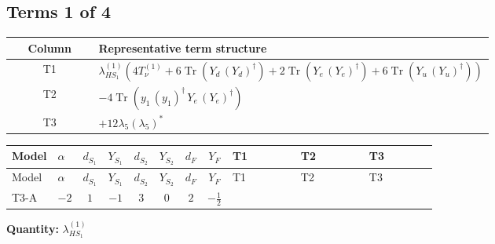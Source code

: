 \documentclass[8pt]{article}
\begin{document}
\begin{landscape}
\subsection*{Terms 1 of 4}
\begin{center}
\begin{tabular}{@{}c >{\raggedright\arraybackslash}p{0.82\linewidth}@{}}
\toprule
Column & Representative term structure \\
\midrule
T1 & \(\displaystyle {\lambda_{HS_1}^{(1)}} (4 T_{\nu}^{(1)}+6 \operatorname{Tr}\!\left({Y_d}\,\left({Y_d}\right)^{\dagger}\right)+2 \operatorname{Tr}\!\left({Y_e}\,\left({Y_e}\right)^{\dagger}\right)+6 \operatorname{Tr}\!\left({Y_u}\,\left({Y_u}\right)^{\dagger}\right))\) \\
\midrule
T2 & \(\displaystyle -4 \operatorname{Tr}\!\left({y_1}\,\left({y_1}\right)^{\dagger}\,{Y_e}\,\left({Y_e}\right)^{\dagger}\right)\) \\
\midrule
T3 & \(\displaystyle +12 {\lambda_5} \left({\lambda_5}\right)^{*}\) \\
\midrule
\bottomrule
\end{tabular}
\end{center}
\smallskip
\tiny
\begin{longtable}{@{}llcccccc >{\raggedright\arraybackslash}p{0.21\linewidth} >{\raggedright\arraybackslash}p{0.21\linewidth} >{\raggedright\arraybackslash}p{0.21\linewidth}@{}}
\toprule
Model & $\alpha$ & $d_{S_1}$ & $Y_{S_1}$ & $d_{S_2}$ & $Y_{S_2}$ & $d_F$ & $Y_F$ & T1 & T2 & T3 \\
\midrule
\endfirsthead
\toprule
Model & $\alpha$ & $d_{S_1}$ & $Y_{S_1}$ & $d_{S_2}$ & $Y_{S_2}$ & $d_F$ & $Y_F$ & T1 & T2 & T3 \\
\midrule
\endhead
T3-A & $-2$ & $1$ & $-1$ & $3$ & $0$ & $2$ & $-\frac{1}{2}$ & \scriptsize\adjustbox{max width=\linewidth}{$\begin{gathered} {\lambda_{HS_1}^{(1)}} (4 T_{\nu}^{(1)}+6 \operatorname{Tr}\!\left({Y_d}\,\left({Y_d}\right)^{\dagger}\right)+2 \operatorname{Tr}\!\left({Y_e}\,\left({Y_e}\right)^{\dagger}\right)+6 \operatorname{Tr}\!\left({Y_u}\,\left({Y_u}\right)^{\dagger}\right))\end{gathered}$} & \scriptsize\adjustbox{max width=\linewidth}{$\begin{gathered} -4 \operatorname{Tr}\!\left({y_1}\,\left({y_1}\right)^{\dagger}\,{Y_e}\,\left({Y_e}\right)^{\dagger}\right)\end{gathered}$} & \scriptsize\adjustbox{max width=\linewidth}{$\begin{gathered} +12 {\lambda_5} \left({\lambda_5}\right)^{*}\end{gathered}$} \\
\midrule
\bottomrule
\end{longtable}
\clearpage
\noindent\textbf{Quantity: }$\lambda_{HS_1}^{(1)}$\par\smallskip

\end{landscape}
\end{document}
